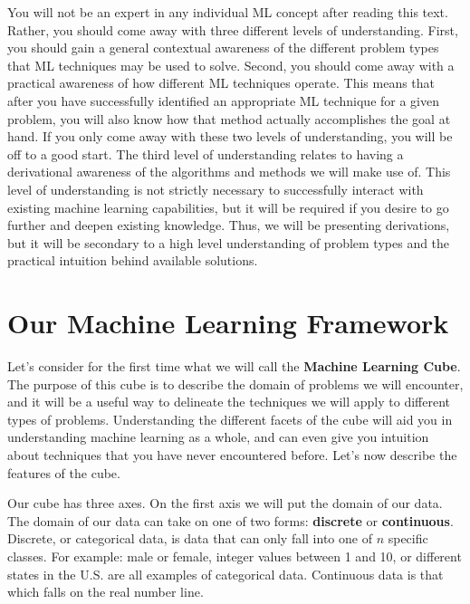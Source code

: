 You will not be an expert in any individual ML concept after reading this text. Rather, you should come away with three different levels of understanding. First, you should gain a general contextual awareness of the different problem types that ML techniques may be used to solve. Second, you should come away with a practical awareness of how different ML techniques operate. This means that after you have successfully identified an appropriate ML technique for a given problem, you will also know how that method actually accomplishes the goal at hand. If you only come away with these two levels of understanding, you will be off to a good start. The third level of understanding relates to having a derivational awareness of the algorithms and methods we will make use of. This level of understanding is not strictly necessary to successfully interact with existing machine learning capabilities, but it will be required if you desire to go further and deepen existing knowledge. Thus, we will be presenting derivations, but it will be secondary to a high level understanding of problem types and the practical intuition behind available solutions.

\section{Our Machine Learning Framework}

Let's consider for the first time what we will call the \textbf{Machine Learning Cube}. The purpose of this cube is to describe the domain of problems we will encounter, and it will be a useful way to delineate the techniques we will apply to different types of problems. Understanding the different facets of the cube will aid you in understanding machine learning as a whole, and can even give you intuition about techniques that you have never encountered before. Let's now describe the features of the cube.

Our cube has three axes. On the first axis we will put the domain of our data. The domain of our data can take on one of two forms: \textbf{discrete} or \textbf{continuous}. Discrete, or categorical data, is data that can only fall into one of $n$ specific classes. For example: male or female, integer values between 1 and 10, or different states in the U.S. are all examples of categorical data. Continuous data is that which falls on the real number line.

